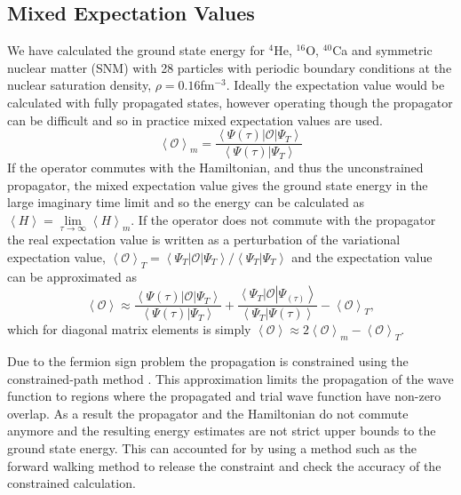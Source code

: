 \documentclass[aps,prl,reprint,superscriptaddress]{revtex4-1}
\newcommand{\ket}[1]{\left| #1 \right>}
\newcommand{\bra}[1]{\left< #1 \right|}
\newcommand{\braket}[2]{\left< #1 | #2 \right>}
\newcommand{\eO}{\left<\mathcal{O}\right>}
\begin{document}
\subsection{Mixed Expectation Values}
We have calculated the ground state energy for $^4$He, $^{16}$O, $^{40}$Ca and symmetric nuclear matter (SNM) with 28 particles with periodic boundary conditions at the nuclear saturation density, $\rho=0.16$fm$^{-3}$. Ideally the expectation value would be calculated with fully propagated states, however operating though the propagator can be difficult and so in practice mixed expectation values are used.
\begin{equation}
   \eO_m = \frac{\bra{\Psi(\tau)}\mathcal{O}\ket{\Psi_T}}{\braket{\Psi(\tau)}{\Psi_T}}
\end{equation}
If the operator commutes with the Hamiltonian, and thus the unconstrained propagator, the mixed expectation value gives the ground state energy in the large imaginary time limit and so the energy can be calculated as $\left<H\right> = \lim\limits_{\tau\rightarrow\infty} \left<H\right>_m$. If the operator does not commute with the propagator the real expectation value is written as a perturbation of the variational expectation value, $\eO_T=\bra{\Psi_T}\mathcal{O}\ket{\Psi_T}/\braket{\Psi_T}{\Psi_T}$ and the expectation value can be approximated as
\begin{equation}
   \eO \approx \frac{\bra{\Psi(\tau)}\mathcal{O}\ket{\Psi_T}}{\braket{\Psi(\tau)}{\Psi_T}} + \frac{\bra{\Psi_T}\mathcal{O}\ket{\Psi_(\tau)}}{\braket{\Psi_T}{\Psi(\tau)}} - \eO_T,
\end{equation}
which for diagonal matrix elements is simply $\eO \approx 2\eO_m - \eO_T$.

Due to the fermion sign problem the propagation is constrained using the constrained-path method \cite{wiringa2000}. This approximation limits the propagation of the wave function to regions where the propagated and trial wave function have non-zero overlap. As a result the propagator and the Hamiltonian do not commute anymore and the resulting energy estimates are not strict upper bounds to the ground state energy. This can accounted for by using a method such as the forward walking method to release the constraint and check the accuracy of the constrained calculation.
\end{document}
